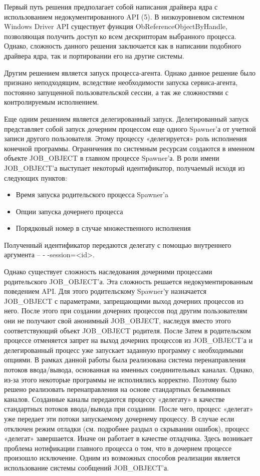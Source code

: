 \documentclass{imcs}
\begin{document}
Первый путь решения предполагает собой написания драйвера ядра с использованием недокументированного API (5). В низкоуровневом системном Windows Driver API существует функция ObReferenceObjectByHandle, позволяющая получить доступ ко всем дескрипторам выбранного процесса. Однако, сложность данного решения заключается как в написании подобного драйвера ядра, так и портировании его на другие системы.

Другим решением является запуск процесса-агента. Однако данное решение было признано неподходящим, вследствие необходимости запуска сервиса-агента, постоянно запущенной пользовательской сессии, а так же сложностями с контролируемым исполнением.

Еще одним решением является делегированный запуск. Делегированный запуск представляет собой запуск дочерним процессом еще одного Spawner'а от учетной записи другого пользователя. Этому процессу «делегируется» роль исполнения конечной программы. Ограничения по системным ресурсам создаются в именном объекте JOB\_OBJECT в главном процессе Spawner'а. В роли имени JOB\_OBJECT'а выступает некоторый идентификатор, получаемый исходя из следующих пунктов:
\begin{itemize}
  \item Время запуска родительского процесса Spawner'a
  \item Опции запуска дочернего процесса
  \item Порядковый номер в случае множественного исполнения
\end{itemize}
Полученный идентификатор передаются делегату с помощью внутреннего аргумента -- - -session=<id>.

Однако существует сложность наследования дочерними процессами родительского JOB\_OBJECT'а. Эта сложность решается недокументированным поведением API. Для этого родительскому Spawner'у назначается JOB\_OBJECT с параметрами, запрещающими выход дочерних процессов из него. После этого при создании дочерних процессов под другим пользователям они не получают свой анонимный JOB\_OBJECT, наследуя вместо этого соответствующий объект JOB\_OBJECT родителя. После Затем в родительском процессе отменяется запрет на выход дочерних процессов из JOB\_OBJECT'а и делегированный процесс уже запускает заданную программу с необходимыми опциями.
В рамках данной работы была реализована система перенаправления потоков ввода/вывода, основанная на именных соединительных каналах. Однако, из-за этого некоторые программы не исполнялись корректно. Поэтому было решено реализовать перенаправления на основе стандартных безымянных каналов. Созданные каналы передаются процессу «делегату» в качестве стандартных потоков ввода/вывода при создании. После чего, процесс «делегат» уже передает эти потоки запускаемому дочернему процессу.
В случае если отключен режим отладки (см. подробнее раздыл о скрывании ошибок), процесс «делегат» завершается. Иначе он работает в качестве отладчика. Здесь возникает проблема нотификации главного процесса о том, что в дочернем процессе произошло исключение. Одним из возможных способов реализации является использование системы сообщений JOB\_OBJECT'а.
\end{document}
